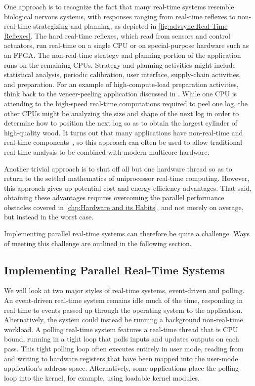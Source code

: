 One approach is to recognize the fact that many real-time systems
resemble biological nervous systems, with responses ranging from
real-time reflexes to non-real-time strategizing and planning,
as depicted in
\cref{fig:advsync:Real-Time Reflexes}.
The hard real-time reflexes, which read from sensors and control
actuators, run real-time on a single CPU or on special-purpose hardware
such as an FPGA\@.
The non-real-time strategy and planning portion of the application runs
on the remaining CPUs.
Strategy and planning activities might include statistical analysis,
periodic calibration, user interface, supply-chain activities, and
preparation.
For an example of high-compute-load preparation activities, think back
to the veneer-peeling application discussed in
.
While one CPU is attending to the high-speed real-time computations
required to peel one log, the other CPUs might be analyzing the size
and shape of the next log in order to determine how to position the
next log so as to obtain the largest cylinder of high-quality wood.
It turns out that many applications have non-real-time and real-time
components~\cite{RobertBerry2008IBMSysJ}, so this approach can
often be used to allow traditional real-time analysis to be combined
with modern multicore hardware.

Another trivial approach is to shut off all but one hardware thread so as
to return to the settled mathematics of uniprocessor real-time
computing.
However, this approach gives up potential cost and energy-efficiency
advantages.
That said, obtaining these advantages requires overcoming the parallel
performance obstacles covered in
\cref{chp:Hardware and its Habits},
and not merely on average, but instead in the worst case.

Implementing parallel real-time systems can therefore be quite a
challenge.
Ways of meeting this challenge are outlined in the following section.

\subsection{Implementing Parallel Real-Time Systems}
\label{sec:advsync:Implementing Parallel Real-Time Systems}

We will look at two major styles of real-time systems, event-driven and
polling.
An event-driven real-time system remains idle much of the time, responding
in real time to events passed up through the operating system to the
application.
Alternatively, the system could instead be running a background
non-real-time workload.
A polling real-time system features a real-time thread that is CPU
bound, running in a tight loop that polls inputs and updates outputs on
each pass.
This tight polling loop often executes entirely in user mode, reading from
and writing to hardware registers that have been mapped into the user-mode
application's address space.
Alternatively, some applications place the polling loop into the kernel,
for example, using loadable kernel modules.

